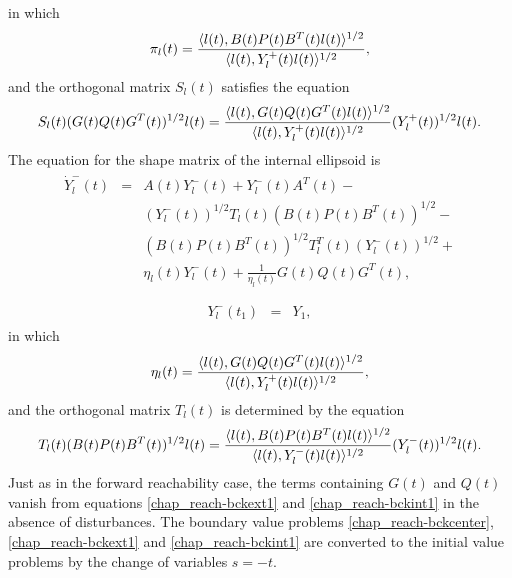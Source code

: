 \documentclass[letterpaper,10pt,english]{sphinxmanual}
\begin{document}
in which
\begin{gather}
\begin{split}\pi_l(t) = \frac{\langle l(t),
B(t)P(t)B^T(t)l(t)\rangle^{1/2}}{\langle l(t),
Y^+_l(t)l(t)\rangle^{1/2}},\end{split}\notag
\end{gather}
and the orthogonal matrix $S_l(t)$ satisfies the equation
\begin{gather}
\begin{split}S_l(t)(G(t)Q(t)G^T(t))^{1/2}l(t) = \frac{\langle l(t),
G(t)Q(t)G^T(t)l(t)\rangle^{1/2}}{\langle l(t),
Y_l^+(t)l(t)\rangle^{1/2}}(Y_l^{+}(t))^{1/2}l(t).\end{split}\notag
\end{gather}
The equation for the shape matrix of the internal ellipsoid is
\label{chap_reach:equation-bckint1}\begin{gather}
\begin{split}\dot{Y}^-_l(t) & = & A(t)Y^-_l(t) + Y^-_l(t)A^T(t) -\nonumber \\
& & (Y_l^{-}(t))^{1/2}T_l(t)(B(t)P(t)B^T(t))^{1/2} -\nonumber \\
& & (B(t)P(t)B^T(t))^{1/2}T_l^T(t)(Y_l^{-}(t))^{1/2} +\nonumber \\
& & \eta_l(t)Y^-_l(t) + \frac{1}{\eta_l(t)}G(t)Q(t)G^T(t),\\\end{split}\label{chap_reach-bckint1}
\end{gather}\label{chap_reach:equation-bckint2}\begin{gather}
\begin{split}Y^-_l(t_1) & = & Y_1,\end{split}\label{chap_reach-bckint2}
\end{gather}
in which
\begin{gather}
\begin{split}\eta_l(t) = \frac{\langle l(t),
G(t)Q(t)G^T(t)l(t)\rangle^{1/2}}{\langle l(t),
Y^+_l(t)l(t)\rangle^{1/2}},\end{split}\notag
\end{gather}
and the orthogonal matrix $T_l(t)$ is determined by the equation
\begin{gather}
\begin{split}T_l(t)(B(t)P(t)B^T(t))^{1/2}l(t) = \frac{\langle l(t),
B(t)P(t)B^T(t)l(t)\rangle^{1/2}}{\langle l(t),
Y_l^-(t)l(t)\rangle^{1/2}}(Y_l^{-}(t))^{1/2}l(t).\end{split}\notag
\end{gather}
Just as in the forward reachability case, the terms containing
$G(t)$ and $Q(t)$ vanish from equations \eqref{chap_reach-bckext1} and
\eqref{chap_reach-bckint1} in the absence of disturbances. The boundary value problems
\eqref{chap_reach-bckcenter}, \eqref{chap_reach-bckext1} and \eqref{chap_reach-bckint1} are converted to the initial
value problems by the change of variables $s = -t$.
\end{document}
